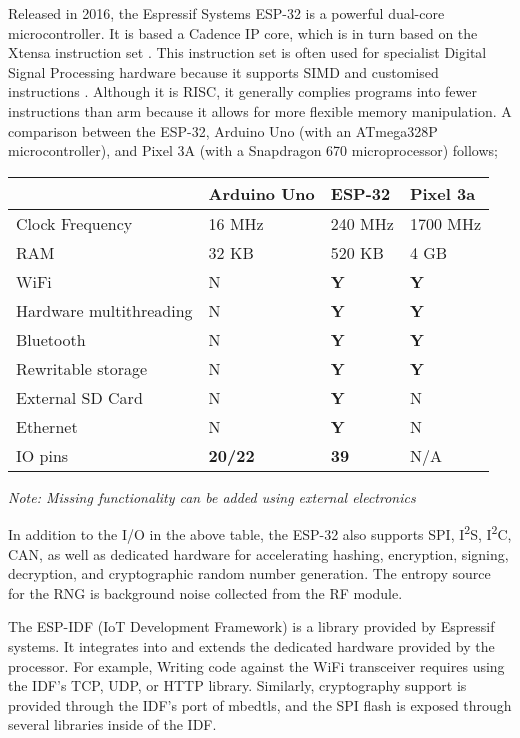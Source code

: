 \documentclass{article}
\begin{document}
Released in 2016, the Espressif Systems ESP-32 is a powerful dual-core microcontroller.
It is based a Cadence IP core, which is in turn based on the Xtensa instruction set \cite{32datasheet}.
This instruction set is often used for specialist Digital Signal Processing hardware because it supports SIMD and customised instructions \cite{lx6datasheet}.
Although it is RISC, it generally complies programs into fewer instructions than arm because it allows for more flexible memory manipulation.
A comparison between the ESP-32, Arduino Uno (with an ATmega328P microcontroller), and Pixel 3A (with a Snapdragon 670 microprocessor) follows;

\begin{table}[h]
\begin{tabular}{l|lll}
						& Arduino Uno		& ESP-32		& Pixel 3a		\\ \hline
Clock Frequency			& 16 MHz			& 240 MHz		& 1700 MHz		\\ \hline
RAM						& 32 KB				& 520 KB		& 4 GB			\\ \hline
WiFi 					& N 				& \textbf{Y}	& \textbf{Y}	\\ \hline
Hardware multithreading	& N 				& \textbf{Y}	& \textbf{Y}	\\ \hline
Bluetooth				& N 				& \textbf{Y}	& \textbf{Y}	\\ \hline
Rewritable storage		& N 				& \textbf{Y}	& \textbf{Y}	\\ \hline
External SD Card		& N 				& \textbf{Y}	& N				\\ \hline
Ethernet				& N 				& \textbf{Y}	& N				\\ \hline
IO pins					& \textbf{20/22}	& \textbf{39}	& N/A			\\

\end{tabular}
\end{table}

\emph{Note: Missing functionality can be added using external electronics}

In addition to the I/O in the above table, the ESP-32 also supports SPI, I\textsuperscript{2}S, I\textsuperscript{2}C, CAN, as well as dedicated hardware for accelerating hashing, encryption, signing, decryption, and cryptographic random number generation.
The entropy source for the RNG is background noise collected from the RF module.

The ESP-IDF (IoT Development Framework) is a library provided by Espressif systems. It integrates into and extends the dedicated hardware provided by the processor.
For example, Writing code against the WiFi transceiver requires using the IDF's TCP, UDP, or HTTP library.
Similarly, cryptography support is provided through the IDF's port of mbedtls, and the SPI flash is exposed through several libraries inside of the IDF.
\end{document}
